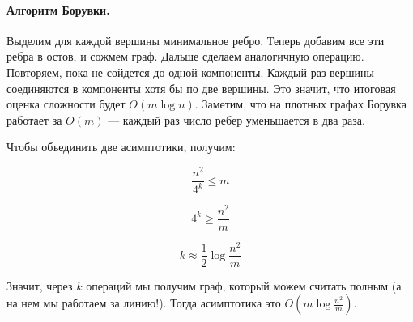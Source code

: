 \documentclass[12pt]{article}
\begin{document}
\paragraph{Алгоритм Борувки.} Выделим для каждой вершины минимальное ребро. Теперь добавим все эти ребра в остов, и сожмем граф. Дальше сделаем аналогичную операцию. Повторяем, пока не сойдется до одной компоненты. Каждый раз вершины соединяются в компоненты хотя бы по две вершины. Это значит, что итоговая оценка сложности будет $O(m \log n)$. Заметим, что на плотных графах Борувка работает за $O(m)$ --- каждый раз число ребер уменьшается в два раза.

Чтобы объединить две асимптотики, получим:

$$\frac{n^2}{4^k} \le m$$

$$4^k \ge \frac{n^2}{m}$$

$$k \approx \frac{1}{2} \log \frac{n^2}{m}$$

Значит, через $k$ операций мы получим граф, который можем считать полным (а на нем мы работаем за линию!). Тогда асимптотика это $O(m \log \frac{n^2}{m})$.
\end{document}
